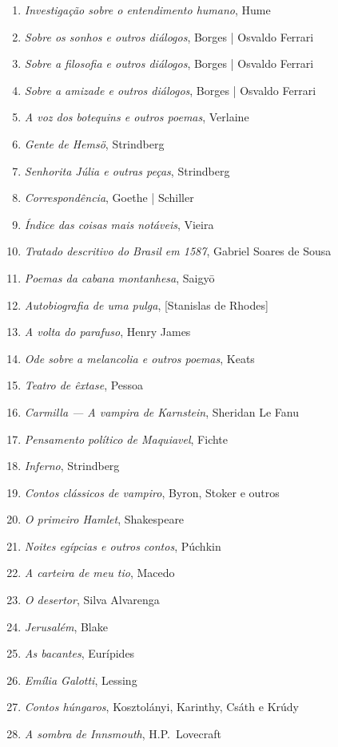 \begin{enumerate}
\item \textit{Investigação sobre o entendimento humano}, Hume
\item \textit{Sobre os sonhos e outros diálogos}, Borges | Osvaldo Ferrari
\item \textit{Sobre a filosofia e outros diálogos}, Borges | Osvaldo Ferrari
\item \textit{Sobre a amizade e outros diálogos}, Borges | Osvaldo Ferrari
\item \textit{A voz dos botequins e outros poemas}, Verlaine 
\item \textit{Gente de Hemsö}, Strindberg 
\item \textit{Senhorita Júlia e outras peças}, Strindberg 
\item \textit{Correspondência}, Goethe | Schiller
\item \textit{Índice das coisas mais notáveis}, Vieira
\item \textit{Tratado descritivo do Brasil em 1587}, Gabriel Soares de Sousa
\item \textit{Poemas da cabana montanhesa}, Saigy\=o
\item \textit{Autobiografia de uma pulga}, [Stanislas de Rhodes]
\item \textit{A volta do parafuso}, Henry James
\item \textit{Ode sobre a melancolia e outros poemas}, Keats 
\item \textit{Teatro de êxtase}, Pessoa
\item \textit{Carmilla --- A vampira de Karnstein}, Sheridan Le Fanu
\item \textit{Pensamento político de Maquiavel}, Fichte
\item \textit{Inferno}, Strindberg
\item \textit{Contos clássicos de vampiro}, Byron, Stoker e outros
\item \textit{O primeiro Hamlet}, Shakespeare
\item \textit{Noites egípcias e outros contos}, Púchkin
\item \textit{A carteira de meu tio}, Macedo
\item \textit{O desertor}, Silva Alvarenga
\item \textit{Jerusalém}, Blake
\item \textit{As bacantes}, Eurípides
\item \textit{Emília Galotti}, Lessing
\item \textit{Contos húngaros}, Kosztolányi, Karinthy, Csáth e Krúdy
\item \textit{A sombra de Innsmouth}, H.P.~Lovecraft

\end{enumerate}
